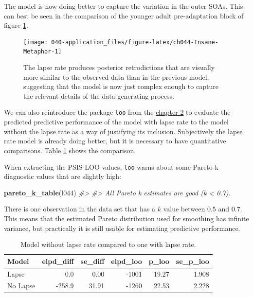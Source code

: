 \documentclass[11pt, oneside, openany]{scrbook}
\newenvironment{Shaded}{\begin{snugshade}}{\end{snugshade}}
\newcommand{\CommentTok}[1]{\textcolor[rgb]{0.56,0.35,0.01}{\textit{#1}}}
\newcommand{\FunctionTok}[1]{\textcolor[rgb]{0.13,0.29,0.53}{\textbf{#1}}}
\newcommand{\NormalTok}[1]{#1}
\begin{document}
The model is now doing better to capture the variation in the outer SOAs. This can best be seen in the comparison of the younger adult pre-adaptation block of figure \ref{fig:ch044-Insane-Metaphor}.

\begin{figure}

{\centering \texttt{[image: 040-application\_files/figure-latex/ch044-Insane-Metaphor-1]} 

}

\caption{The lapse rate produces posterior retrodictions that are visually more similar to the observed data than in the previous model, suggesting that the model is now just complex enough to capture the relevant details of the data generating process.}\label{fig:ch044-Insane-Metaphor}
\end{figure}

We can also reintroduce the package \texttt{loo} from the \protect\hyperlink{methods}{chapter 2} to evaluate the predicted predictive performance of the model with lapse rate to the model without the lapse rate as a way of justifying its inclusion. Subjectively the lapse rate model is already doing better, but it is necessary to have quantitative comparisons. Table \ref{tab:ch044-Straw-Epsilon} shows the comparison.

When extracting the PSIS-LOO values, \texttt{loo} warns about some Pareto k diagnostic values that are slightly high:


\begin{Shaded}
\begin{Highlighting}[]
\FunctionTok{pareto\_k\_table}\NormalTok{(l044)}
\CommentTok{\#\textgreater{} }
\CommentTok{\#\textgreater{} All Pareto k estimates are good (k \textless{} 0.7).}
\end{Highlighting}
\end{Shaded}


There is one observation in the data set that has a \(k\) value between \(0.5\) and \(0.7\). This means that the estimated Pareto distribution used for smoothing has infinite variance, but practically it is still usable for estimating predictive performance.

\begin{table}[!h]
\centering
\caption{\label{tab:ch044-Straw-Epsilon}Model without lapse rate compared to one with lapse rate.}
\centering
\begin{tabular}[t]{lrrrrr}
\toprule
Model & elpd\_diff & se\_diff & elpd\_loo & p\_loo & se\_p\_loo\\
\midrule
Lapse & 0.0 & 0.00 & -1001 & 19.27 & 1.908\\
No Lapse & -258.9 & 31.91 & -1260 & 22.53 & 2.228\\
\bottomrule
\end{tabular}
\end{table}
\end{document}
